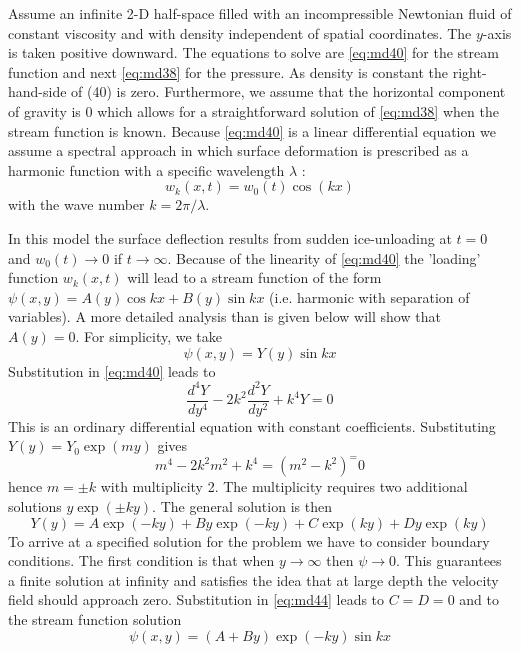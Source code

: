 Assume an infinite 2-D half-space filled with an incompressible Newtonian fluid of
constant viscosity and with density independent of spatial coordinates. The $y$-axis is taken
positive downward. The equations to solve are \eqref{eq:md40} for the stream function and next \eqref{eq:md38}
for the pressure. As density is constant the right-hand-side of (40) is zero. Furthermore,
we assume that the horizontal component of gravity is 0 which allows for a
straightforward solution of \eqref{eq:md38} when the stream function is known.
Because \eqref{eq:md40} is a linear differential equation we assume a spectral approach in which
surface deformation is prescribed as a harmonic function with a specific wavelength $\lambda$ :
\begin{equation}
w_k(x,t) = w_0(t) \cos (kx) 
\label{eq:md41}
\end{equation}
with the wave number $k = 2\pi /\lambda$.




In this model the surface deflection results from sudden ice-unloading at $t=0$ and
$w_0(t)\rightarrow 0$ if $t\rightarrow\infty$. 
Because of the linearity of \eqref{eq:md40} the 'loading' function $w_k(x,t)$ will
lead to a stream function of the form $\psi(x,y)=A(y) \cos kx + B(y) \sin kx$ (i.e. harmonic
with separation of variables). A more detailed analysis than is given below will show
that $A(y) =0$. For simplicity, we take
\begin{equation}
\psi(x,y)=Y(y) \sin kx
\label{eq:md42}
\end{equation}
Substitution in \eqref{eq:md40} leads to
\begin{equation}
\frac{d^4Y}{dy^4} - 2k^2 \frac{d^2Y}{dy^2} + k^4 Y = 0
\label{eq:md43}
\end{equation}
This is an ordinary differential equation with constant coefficients. Substituting 
$Y(y)=Y_0 \exp (m y)$ gives 
\[
m^4 - 2k^2 m^2 + k^4 = (m^2-k^2)^=0
\]
hence $m=\pm k$ with multiplicity 2.
The multiplicity requires two additional solutions $y \exp (\pm ky)$. The general solution is then
\begin{equation}
Y(y) = A \exp (-ky) + By \exp(-ky) + C \exp (ky) + Dy\exp (ky)
\label{eq:md44}
\end{equation}
To arrive at a specified solution for the problem we have to consider boundary
conditions. The first condition is that when $y\rightarrow\infty$ then $\psi\rightarrow 0$. 
This guarantees a finite
solution at infinity and satisfies the idea that at large depth the velocity field should
approach zero. Substitution in \eqref{eq:md44} leads to $C=D=0$ and to the stream function
solution
\begin{equation}
\psi(x,y) = (A+By )\exp (-ky) \sin kx 
\label{eq:md45}
\end{equation}

